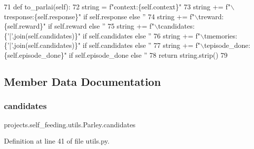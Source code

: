 \begin{DoxyCode}
71     \textcolor{keyword}{def }to\_parlai(self):
72         string = f\textcolor{stringliteral}{"context:\{self.context\}"}
73         string += f\textcolor{stringliteral}{"\(\backslash\)tresponse:\{self.response\}"} \textcolor{keywordflow}{if} self.response \textcolor{keywordflow}{else} \textcolor{stringliteral}{''}
74         string += f\textcolor{stringliteral}{"\(\backslash\)treward:\{self.reward\}"} \textcolor{keywordflow}{if} self.reward \textcolor{keywordflow}{else} \textcolor{stringliteral}{''}
75         string += f\textcolor{stringliteral}{"\(\backslash\)tcandidates:\{'|'.join(self.candidates)\}"} \textcolor{keywordflow}{if} self.candidates \textcolor{keywordflow}{else} \textcolor{stringliteral}{''}
76         string += f\textcolor{stringliteral}{"\(\backslash\)tmemories:\{'|'.join(self.candidates)\}"} \textcolor{keywordflow}{if} self.candidates \textcolor{keywordflow}{else} \textcolor{stringliteral}{''}
77         string += f\textcolor{stringliteral}{"\(\backslash\)tepisode\_done:\{self.episode\_done\}"} \textcolor{keywordflow}{if} self.episode\_done \textcolor{keywordflow}{else} \textcolor{stringliteral}{''}
78         \textcolor{keywordflow}{return} string.strip()
79 
\end{DoxyCode}


\subsection{Member Data Documentation}
\mbox{\label{classprojects_1_1self__feeding_1_1utils_1_1Parley_a083d2e03c1b933ef18de47015029e766}} 
\subsubsection{\texorpdfstring{candidates}{candidates}}
{\footnotesize\ttfamily projects.\+self\+\_\+feeding.\+utils.\+Parley.\+candidates}



Definition at line 41 of file utils.\+py.

\mbox{\label{classprojects_1_1self__feeding_1_1utils_1_1Parley_adee3a4c5a893838b18aab79540456684}} 
